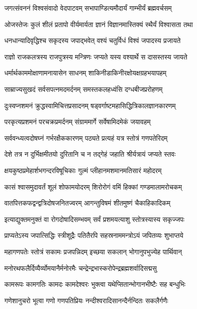\twolineshloka
{जगत्संवननं विश्वसंवादो वेदपाटवम्}
{सभापाण्डित्यमौदार्यं गाम्भीर्यं ब्रह्मवर्चसम्}

\twolineshloka
{ओजस्तेजः कुलं शीलं प्रतापो वीर्यमार्यता}
{ज्ञानं विज्ञानमास्तिक्यं स्थैर्यं विश्वासता तथा}

\twolineshloka
{धनधान्यादिवृद्धिश्च सकृदस्य जपाद्भवेत्}
{वश्यं चतुर्विधं विश्वं जपादस्य प्रजायते}

\twolineshloka
{राज्ञो राजकलत्रस्य राजपुत्रस्य मन्त्रिणः}
{जप्यते यस्य वश्यार्थे स दासस्तस्य जायते}

\twolineshloka
{धर्मार्थकाममोक्षाणामनायासेन साधनम्}
{शाकिनीडाकिनीरक्षोयक्षग्रहभयापहम्}

\twolineshloka
{साम्राज्यसुखदं सर्वसपत्नमदमर्दनम्}
{समस्तकलहध्वंसि दग्धबीजप्ररोहणम्}

\twolineshloka
{दुःस्वप्नशमनं क्रुद्धस्वामिचित्तप्रसादनम्}
{षड्वर्गाष्टमहासिद्धित्रिकालज्ञानकारणम्}

\twolineshloka
{परकृत्यप्रशमनं परचक्रप्रमर्दनम्}
{संग्राममार्गे सर्वेषामिदमेकं जयावहम्}

\twolineshloka
{सर्ववन्ध्यत्वदोषघ्नं गर्भरक्षैककारणम्}
{पठ्यते प्रत्यहं यत्र स्तोत्रं गणपतेरिदम्}

\twolineshloka
{देशे तत्र न दुर्भिक्षमीतयो दुरितानि च}
{न तद्गेहं जहाति श्रीर्यत्रायं जप्यते स्तवः}

\twolineshloka
{क्षयकुष्ठप्रमेहार्शभगन्दरविषूचिकाः}
{गुल्मं प्लीहानमशमानमतिसारं महोदरम्}

\twolineshloka
{कासं श्वासमुदावर्तं शूलं शोफामयोदरम्}
{शिरोरोगं वमिं हिक्कां गण्डमालामरोचकम्}

\twolineshloka
{वातपित्तकफद्वन्द्वत्रिदोषजनितज्वरम्}
{आगन्तुविषमं शीतमुष्णं चैकाहिकादिकम्}

\twolineshloka
{इत्याद्युक्तमनुक्तं वा रोगदोषादिसम्भवम्}
{सर्वं प्रशमयत्याशु स्तोत्रस्यास्य सकृज्जपः}

\twolineshloka
{प्राप्यतेऽस्य जपात्सिद्धिः स्त्रीशूद्रैः पतितैरपि}
{सहस्रनाममन्त्रोऽयं जपितव्यः शुभाप्तये}

\twolineshloka
{महागणपतेः स्तोत्रं सकामः प्रजपन्निदम्}
{इच्छया सकलान् भोगानुपभुज्येह पार्थिवान्}

\twolineshloka
{मनोरथफलैर्दिव्यैर्व्योमयानैर्मनोरमैः}
{चन्द्रेन्द्रभास्करोपेन्द्रब्रह्मशर्वादिसद्मसु}

\twolineshloka
{कामरूपः कामगतिः कामदः कामदेश्वरः}
{भुक्त्वा यथेप्सितान्भोगानभीष्टैः सह बन्धुभिः}

\twolineshloka
{गणेशानुचरो भूत्वा गणो गणपतिप्रियः}
{नन्दीश्वरादिसानन्दैर्नन्दितः सकलैर्गणैः}

